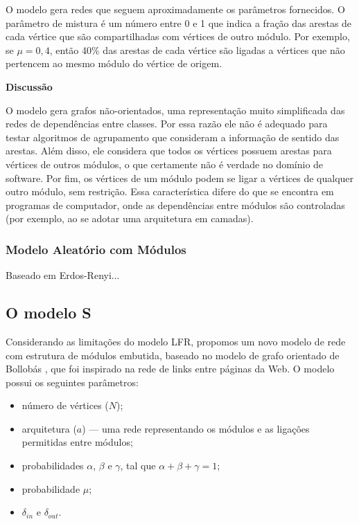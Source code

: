 \documentclass{acm_proc_article-sp}
\begin{document}
O modelo gera redes que seguem aproximadamente os parâmetros fornecidos. O parâmetro de mistura é um número entre 0 e 1 que indica a fração das arestas de cada vértice que são compartilhadas com vértices de outro módulo. Por exemplo, se $\mu = 0,4$, então 40\% das arestas de cada vértice são ligadas a vértices que não pertencem ao mesmo módulo do vértice de origem.

  \textbf{Discussão}

  O modelo gera grafos não-orientados, uma representação muito simplificada das redes de dependências entre classes. Por essa razão ele não é adequado para testar algoritmos de agrupamento que consideram a informação de sentido das arestas. Além disso, ele considera que todos os vértices possuem arestas para vértices de outros módulos, o que certamente não é verdade no domínio de software. Por fim, os vértices de um módulo podem se ligar a vértices de qualquer outro módulo, sem restrição. Essa característica difere do que se encontra em programas de computador, onde as dependências entre módulos são controladas (por exemplo, ao se adotar uma arquitetura em camadas).

\subsubsection{Modelo Aleatório com Módulos}

Baseado em Erdos-Renyi...

\subsection{O modelo S}

Considerando as limitações do modelo LFR, propomos um novo modelo de rede com estrutura de módulos embutida, baseado no modelo de grafo orientado de Bollobás \cite{Bollobas2003}, que foi inspirado na rede de links entre páginas da Web. O modelo possui os seguintes parâmetros:

\begin{itemize}
  \item número de vértices ($N$);
  \item arquitetura ($a$) --- uma rede representando os módulos e as ligações permitidas entre módulos;
  \item probabilidades $\alpha$, $\beta$ e $\gamma$, tal que $\alpha + \beta + \gamma = 1$;
  \item probabilidade $\mu$;
  \item $\delta_{in}$ e $\delta_{out}$.
\end{itemize}
\end{document}
